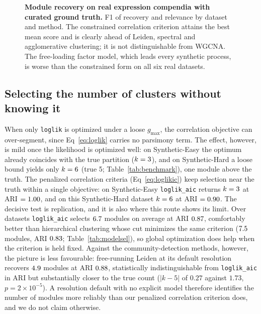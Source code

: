 \begin{figure}[!h]
\caption{\textbf{Module recovery on real expression compendia with curated
ground truth.} F1 of recovery and relevance by dataset and method. The
constrained correlation criterion attains the best mean score and is clearly
ahead of Leiden, spectral and agglomerative clustering; it is not distinguishable
from WGCNA. The free-loading factor model, which leads every synthetic process,
is worse than the constrained form on all six real datasets.}
\label{fig:saelens}
\end{figure}

\subsection*{Selecting the number of clusters without knowing it}
When only \texttt{loglik} is optimized under a loose $g_{\max}$, the correlation
objective can over-segment, since Eq~\eqref{eq:loglik} carries no parsimony term.
The effect, however, is mild once the likelihood is optimized well: on
Synthetic-Easy the optimum already coincides with the true partition
($k=3{}$), and on Synthetic-Hard a loose bound yields only
$k=6{}$ (true 5; Table~\ref{tab:benchmark}), one module above the truth.
The penalized correlation criteria (Eq~\eqref{eq:loglikic}) keep selection near
the truth within a single objective: on Synthetic-Easy \texttt{loglik\_aic}
returns $k=3{}$ at ARI $=1.00{}$, and on this Synthetic-Hard
dataset $k=6{}$ at ARI $=0.90{}$. The decisive test is replication, and it is
also where this route shows its limit. Over \NSeeds{} datasets
\texttt{loglik\_aic} selects $6.7{}$ modules on average at ARI
$0.87{}$, comfortably better than hierarchical clustering whose cut
minimizes the same criterion ($7.5{}$ modules, ARI $0.83{}$;
Table~\ref{tab:modelsel}), so global optimization does help when the criterion is
held fixed. Against the community-detection methods, however, the picture is less
favourable: free-running Leiden at its default resolution recovers
$4.9{}$ modules at ARI $0.88{}$, statistically indistinguishable
from \texttt{loglik\_aic} in ARI but substantially closer to the true count
($\lvert k-5\rvert$ of $0.27$ against $1.73$, $p=2\times10^{-5}$). A resolution
default with no explicit model therefore identifies the number of modules more
reliably than our penalized correlation criterion does, and we do not claim
otherwise.

